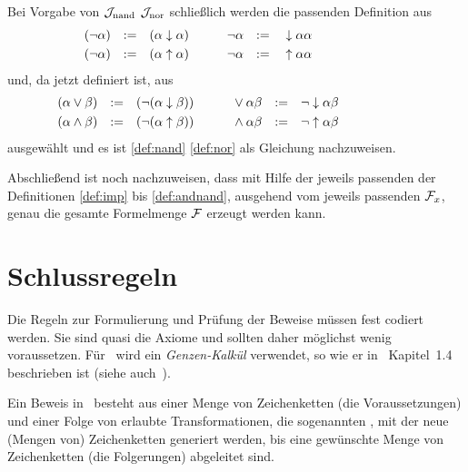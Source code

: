 Bei Vorgabe von $\mathcal{J}_{\mathrm{nand}}$ \textbzw $\mathcal{J}_{\mathrm{nor}}$ schließlich werden die passenden Definition aus
\begin{align}
	& (\lnot \alpha) & := & & & (\alpha \downarrow \alpha)
	& &&&&
	&  \lnot \alpha  & := & & &  \downarrow \alpha \alpha
	\label{def:notnor}
	\\
	& (\lnot \alpha) & := & & & (\alpha \uparrow \alpha)
	& &&&&
	&  \lnot \alpha  & := & & &  \uparrow \alpha \alpha
	\label{def:notnand}
	&&&&&&&&&&
\end{align}
und, da \symqt{$\lnot$} jetzt definiert ist, aus
\begin{align}
	& (\alpha \lor \beta) & := & & & (\lnot(\alpha \downarrow \beta))
	& &&&&
	&  \lor \alpha \beta  & := & & &  \lnot \downarrow \alpha \beta
	\label{def:ornor}
	\\
	& (\alpha \land \beta) & := & & & (\lnot(\alpha \uparrow \beta))
	& &&&&
	&  \land \alpha \beta  & := & & &  \lnot \uparrow \alpha \beta
	\label{def:andnand}
	&&&&&&&&&&
\end{align}
ausgewählt und es ist \eqref{def:nand} \textbzw \eqref{def:nor} als Gleichung nachzuweisen.

Abschließend ist noch nachzuweisen, dass mit Hilfe der jeweils passenden der Definitionen \eqref{def:imp} bis \eqref{def:andnand}, ausgehend vom jeweils passenden $\mathcal{F}_x$, genau die gesamte Formelmenge $\mathcal{F}$ erzeugt werden kann.

\section{Schlussregeln}%
\label{sec:Schlussregeln}

Die Regeln zur Formulierung und Prüfung der Beweise müssen fest codiert werden.
Sie sind quasi die Axiome und sollten daher möglichst wenig voraussetzen.
Für \ASBA\ wird ein \emph{Genzen-Kalkül} verwendet, so wie er in~\cite{bib:Rautenberg} Kapitel~1.4 beschrieben ist (siehe auch~\cite{bib:NatuerlichesSchliessen,bib:Schlussregel}).

Ein Beweis in \ASBA\ besteht aus einer Menge von Zeichenketten (die Voraussetzungen) und einer Folge von erlaubte Transformationen, die sogenannten \emph{}, mit der neue (Mengen von) Zeichenketten generiert werden, bis eine gewünschte Menge von Zeichenketten (die Folgerungen) abgeleitet sind.

